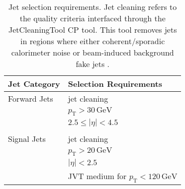 \begin{table}
  \centering
  \begin{tabular}{l l}
    \toprule
   Jet Category & Selection Requirements \\
    \midrule
    Forward Jets & jet cleaning \\
    & $p_{\mathrm{T}} > 30\,\mathrm{GeV}$ \\
    & $2.5 \leq \left|\eta\right| < 4.5$ \\ 
    &\\
    Signal Jets & jet cleaning \\
    & $p_{\mathrm{T}} > 20\,\mathrm{GeV}$ \\
    & $ \left|\eta\right| < 2.5$ \\ 
    & JVT medium for $p_{\mathrm{T}} < 120\,\mathrm{GeV}$ \\
    \bottomrule
  \end{tabular}
  \caption{Jet selection requirements. Jet cleaning refers to the quality
    criteria interfaced through the JetCleaningTool CP tool. This tool removes
    jets in regions where either coherent/sporadic calorimeter noise or
    beam-induced background fake jets
    \cite{ATLAS-CONF-2015-029,Gonski:2272136}.}
  
  \label{tab:jet-cats}
\end{table}